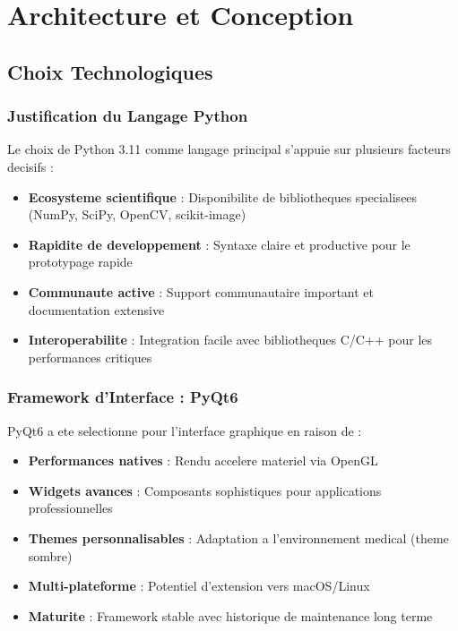 \documentclass[12pt,a4paper]{article}
\begin{document}
\section{Architecture et Conception}

\subsection{Choix Technologiques}

\subsubsection{Justification du Langage Python}

Le choix de Python 3.11 comme langage principal s'appuie sur plusieurs facteurs decisifs :

\begin{itemize}
\item \textbf{Ecosysteme scientifique} : Disponibilite de bibliotheques specialisees (NumPy, SciPy, OpenCV, scikit-image)
\item \textbf{Rapidite de developpement} : Syntaxe claire et productive pour le prototypage rapide
\item \textbf{Communaute active} : Support communautaire important et documentation extensive
\item \textbf{Interoperabilite} : Integration facile avec bibliotheques C/C++ pour les performances critiques
\end{itemize}

\subsubsection{Framework d'Interface : PyQt6}

PyQt6 a ete selectionne pour l'interface graphique en raison de :

\begin{itemize}
\item \textbf{Performances natives} : Rendu accelere materiel via OpenGL
\item \textbf{Widgets avances} : Composants sophistiques pour applications professionnelles
\item \textbf{Themes personnalisables} : Adaptation a l'environnement medical (theme sombre)
\item \textbf{Multi-plateforme} : Potentiel d'extension vers macOS/Linux
\item \textbf{Maturite} : Framework stable avec historique de maintenance long terme
\end{itemize}
\end{document}
